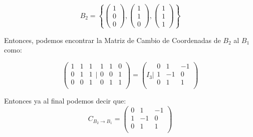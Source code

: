 \documentclass[12pt]{report}                                %
\begin{document}
        \begin{equation*}
            B_2 = \left\{
                \begin{pmatrix} 1 \\ 0 \\0 \end{pmatrix}, \begin{pmatrix} 1 \\ 1 \\0 \end{pmatrix},
                \begin{pmatrix} 1 \\ 1 \\1 \end{pmatrix}
            \right\}
        \end{equation*}

        Entonces, podemos encontrar la Matriz de Cambio de Coordenadas de $B_2$ al $B_1$ como:

        \begin{equation*}
            \left(
            \begin{matrix}
                1 & 1 & 1 \\
                0 & 1 & 1 \\
                0 & 0 & 1 \\
            \end{matrix}
            \Big|
            \begin{matrix}
                1 & 1 & 0 \\
                0 & 0 & 1 \\
                0 & 1 & 1 \\
            \end{matrix}
            \right)
            = \left(
            I_3
            \big|
            \begin{matrix}
                0 & 1 & -1 \\
                1 & -1 & 0 \\
                0 & 1 & 1 \\
            \end{matrix}
            \right)
        \end{equation*}

        Entonces ya al final podemos decir que:
        \begin{equation*}
            C_{B_2 \to B_1} =
            \begin{pmatrix}
                0 & 1 & -1 \\
                1 & -1 & 0 \\
                0 & 1 & 1 \\
            \end{pmatrix}
        \end{equation*}
\end{document}
